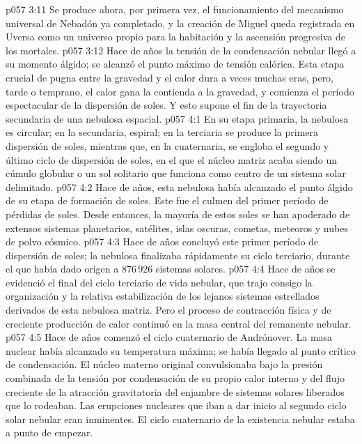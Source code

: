 \vs p057 3:11 Se produce ahora, por primera vez, el funcionamiento del mecanismo universal de Nebadón ya completado, y la creación de Miguel queda registrada en Uversa como un universo propio para la habitación y la ascensión progresiva de los mortales.
\vs p057 3:12 \pc Hace  de años la tensión de la condensación nebular llegó a su momento álgido; se alcanzó el punto máximo de tensión calórica. Esta etapa crucial de pugna entre la gravedad y el calor dura a veces muchas eras, pero, tarde o temprano, el calor gana la contienda a la gravedad, y comienza el período espectacular de la dispersión de soles. Y esto supone el fin de la trayectoria secundaria de una nebulosa espacial.
\vs p057 4:1 En su etapa primaria, la nebulosa es circular; en la secundaria, espiral; en la terciaria se produce la primera dispersión de soles, mientras que, en la cuaternaria, se engloba el segundo y último ciclo de dispersión de soles, en el que el núcleo matriz acaba siendo un cúmulo globular o un sol solitario que funciona como centro de un sistema solar delimitado.
\vs p057 4:2 \pc Hace  de años, esta nebulosa había alcanzado el punto álgido de su etapa de formación de soles. Este fue el culmen del primer período de pérdidas de soles. Desde entonces, la mayoría de estos soles se han apoderado de extensos sistemas planetarios, satélites, islas oscuras, cometas, meteoros y nubes de polvo cósmico.
\vs p057 4:3 \pc Hace  de años concluyó este primer período de dispersión de soles; la nebulosa finalizaba rápidamente su ciclo terciario, durante el que había dado origen a 876\,926 sistemas solares.
\vs p057 4:4 \pc Hace  de años se evidenció el final del ciclo terciario de vida nebular, que trajo consigo la organización y la relativa estabilización de los lejanos sistemas estrellados derivados de esta nebulosa matriz. Pero el proceso de contracción física y de creciente producción de calor continuó en la masa central del remanente nebular.
\vs p057 4:5 \pc Hace  de años comenzó el ciclo cuaternario de Andrónover. La masa nuclear había alcanzado su temperatura máxima; se había llegado al punto crítico de condensación. El núcleo materno original convulsionaba bajo la presión combinada de la tensión por condensación de su propio calor interno y del flujo creciente de la atracción gravitatoria del enjambre de sistemas solares liberados que lo rodeaban. Las erupciones nucleares que iban a dar inicio al segundo ciclo solar nebular eran inminentes. El ciclo cuaternario de la existencia nebular estaba a punto de empezar.
